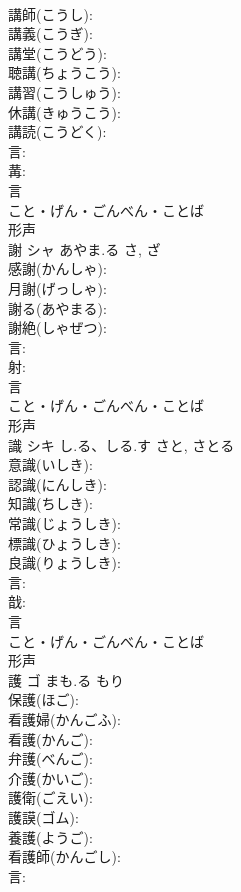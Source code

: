 \documentclass[8pt]{extreport}
\begin{document}
\begin{CJK}{UTF8}{min}
\\	講師(こうし): 
\\	講義(こうぎ): 
\\	講堂(こうどう): 
\\	聴講(ちょうこう): 
\\	講習(こうしゅう): 
\\	休講(きゅうこう): 
\\	講読(こうどく): 
\\	言: 
\\	冓: 
\\	言	
\\	こと・げん・ごんべん・ことば	
\\	形声 
\\	謝	シャ	あやま.る	さ, ざ	
\\	感謝(かんしゃ): 
\\	月謝(げっしゃ): 
\\	謝る(あやまる): 
\\	謝絶(しゃぜつ): 
\\	言: 
\\	射: 
\\	言	
\\	こと・げん・ごんべん・ことば	
\\	形声 
\\	識	シキ	し.る、しる.す	さと, さとる	
\\	意識(いしき): 
\\	認識(にんしき): 
\\	知識(ちしき): 
\\	常識(じょうしき): 
\\	標識(ひょうしき): 
\\	良識(りょうしき): 
\\	言: 
\\	戠: 
\\	言	
\\	こと・げん・ごんべん・ことば	
\\	形声 
\\	護	ゴ	まも.る	もり	
\\	保護(ほご): 
\\	看護婦(かんごふ): 
\\	看護(かんご): 
\\	弁護(べんご): 
\\	介護(かいご): 
\\	護衛(ごえい): 
\\	護謨(ゴム): 
\\	養護(ようご): 
\\	看護師(かんごし): 
\\	言: 

\end{CJK}
\end{document}
